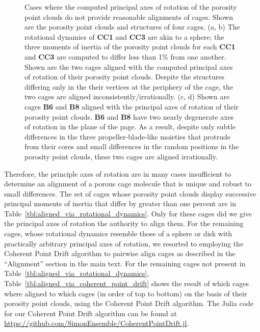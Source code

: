 \documentclass[journal=jacsat,manuscript=article]{achemso}
\begin{document}
\begin{figure}
	\caption{Cases where the computed principal axes of rotation of the porosity point clouds do not provide reasonable alignments of cages. Shown are the porosity point clouds and structures of four cages. (a, b) The rotational dynamics of \textbf{CC1} and \textbf{CC3} are akin to a sphere; the three moments of inertia of the porosity point clouds for each \textbf{CC1} and \textbf{CC3} are computed to differ less than 1\% from one another. Shown are the two cages aligned with the computed principal axes of rotation of their porosity point clouds. Despite the structures differing only in the their vertices at the periphery of the cage, the two cages are aligned inconsistently/irrationally. (c, d) Shown are cages \textbf{B6} and \textbf{B8} aligned with the principal axes of rotation of their porosity point clouds. \textbf{B6} and \textbf{B8} have two nearly degenerate axes of rotation in the plane of the page. As a result, despite only subtle differences in the three propeller-blade-like moieties that protrude from their cores and small differences in the random positions in the porosity point clouds, these two cages are aligned irrationally.
	} \label{fig:misaligned}
\end{figure}

Therefore, the principle axes of rotation are in many cases insufficient to determine an alignment of a porous cage molecule that is unique and robust to small differences. The set of cages whose porosity point clouds display successive principal moments of inertia that differ by greater than one percent are in Table~\ref{tbl:aligned_via_rotational_dynamics}. Only for these cages did we give the principal axes of rotation the authority to align them. For the remaining cages, whose rotational dynamics resemble those of a sphere or disk with practically arbitrary principal axes of rotation, we resorted to employing the Coherent Point Drift algorithm to pairwise align cages as described in the ``Alignment'' section in the main text. For the remaining cages not present in Table~\ref{tbl:aligned_via_rotational_dynamics}, Table~\ref{tbl:aligned_via_coherent_point_drift} shows the result of which cages where aligned to which cages (in order of top to bottom) on the basis of their porosity point clouds, using the Coherent Point Drift algorithm. The Julia code for our Coherent Point Drift algorithm can be found at \url{https://github.com/SimonEnsemble/CoherentPointDrift.jl}.
\end{document}
